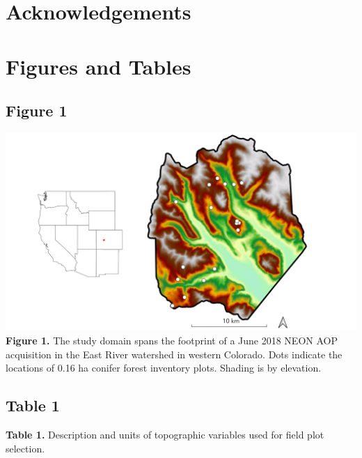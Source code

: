 \documentclass[
  12pt,
]{article}
\begin{document}
\hypertarget{acknowledgements}{%
\section{Acknowledgements}\label{acknowledgements}}

\clearpage

\newpage

\hypertarget{figures-and-tables}{%
\section{Figures and Tables}\label{figures-and-tables}}

\hypertarget{figure-1}{%
\subsection{Figure 1}\label{figure-1}}

\includegraphics{./Figures/Fig1.png} \textbf{Figure 1.} The study domain
spans the footprint of a June 2018 NEON AOP acquisition in the East
River watershed in western Colorado. Dots indicate the locations of 0.16
ha conifer forest inventory plots. Shading is by elevation. \clearpage

\newpage

\hypertarget{table-1}{%
\subsection{Table 1}\label{table-1}}

\textbf{Table 1.} Description and units of topographic variables used
for field plot selection.
\end{document}
